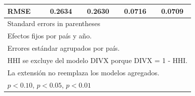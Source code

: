 \begin{table}[htbp]
\begin{tabular}{l*{4}{c}}
RMSE                &      0.2634         &      0.2630         &      0.0716         &      0.0709         \\
\bottomrule
\multicolumn{5}{l}{\footnotesize Standard errors in parentheses}\\
\multicolumn{5}{l}{\footnotesize Efectos fijos por país y año.}\\
\multicolumn{5}{l}{\footnotesize Errores estándar agrupados por país.}\\
\multicolumn{5}{l}{\footnotesize HHI se excluye del modelo DIVX porque DIVX = 1 - HHI.}\\
\multicolumn{5}{l}{\footnotesize La extensión no reemplaza los modelos agregados.}\\
\multicolumn{5}{l}{\footnotesize \sym{*} \(p<0.10\), \sym{**} \(p<0.05\), \sym{***} \(p<0.01\)}\\
\end{tabular}
\end{table}
